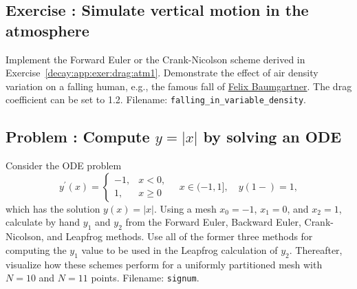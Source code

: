 \documentclass[graybox,sectrefs,envcountresetchap,open=right,final]{svmonodo}
\newenvironment{doconceexercise}{}{}
\newcounter{doconceexercisecounter}
\begin{document}
\begin{doconceexercise}

\subsection*{Exercise \thedoconceexercisecounter: Simulate vertical motion in the atmosphere}

\label{decay:app:exer:drag:atm2}

Implement the Forward Euler or the Crank-Nicolson scheme
derived in Exercise~\ref{decay:app:exer:drag:atm1}.
Demonstrate the effect of air density variation on a falling
human, e.g., the famous fall of \href{{http://en.wikipedia.org/wiki/Felix_Baumgartner}}{Felix Baumgartner}. The drag coefficient can be set to 1.2.
\noindent Filename: \Verb!falling_in_variable_density!.

\end{doconceexercise}




\begin{doconceexercise}

\subsection*{Problem \thedoconceexercisecounter: Compute $y=|x|$ by solving an ODE}

\label{decay:app:exer:signum}

Consider the ODE problem
\[
y^{\prime}(x) = \left\lbrace\begin{array}{ll}
-1, & x < 0,\\ 
1, & x \geq 0
\end{array}\right.\quad x\in (-1, 1],
\quad y(1-)=1,
\]
which has the solution $y(x)=|x|$.
Using a mesh $x_0=-1$, $x_1=0$, and $x_2=1$, calculate by hand
$y_1$ and $y_2$ from the Forward Euler, Backward Euler, Crank-Nicolson,
and Leapfrog methods. Use all of the former three methods for computing
the $y_1$ value to be used in the Leapfrog calculation of $y_2$.
Thereafter, visualize how these schemes perform for a uniformly partitioned
mesh with $N=10$ and $N=11$ points.
\noindent Filename: \texttt{signum}.

\end{doconceexercise}
\end{document}
